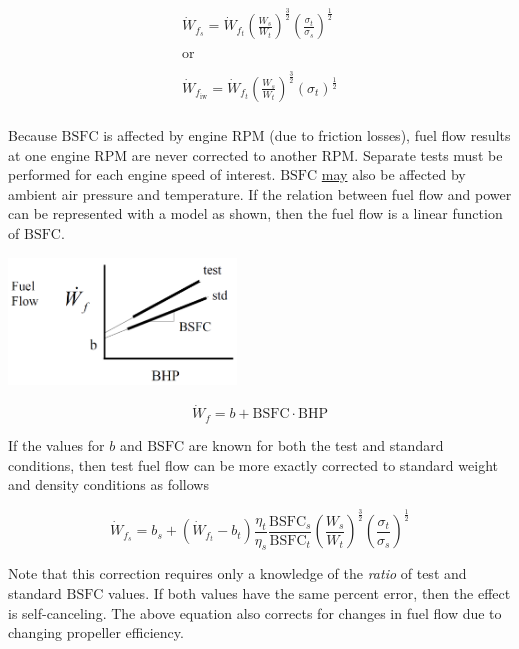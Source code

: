 \documentclass[
]{book}
\begin{document}
\begin{align}
\dot{W}_{f_s} = \dot{W}_{f_t} \left( \frac{W_s}{W_t} \right)^{\frac{3}{2}} \left( \frac{\sigma_t}{\sigma_s} \right)^{\frac{1}{2}} \\
\\
\text{or} \\
\\
\dot{W}_{f_{\text{iw}}} = \dot{W}_{f_t} \left( \frac{W_s}{W_t} \right)^{\frac{3}{2}} \left( \sigma_t \right)^{\frac{1}{2}} \\
\label{eq:fuel-flow-std}
\end{align}

Because \(\mathrm{BSFC}\) is affected by engine \(\mathrm{RPM}\) (due to
friction losses), fuel flow results at one engine \(\mathrm{RPM}\) are never
corrected to another \(\mathrm{RPM}\). Separate tests must be performed for each
engine speed of interest. \(\mathrm{BSFC}\) \underline{may} also be affected
by ambient air pressure and temperature. If the relation between fuel flow and
power can be represented with a model as shown, then the fuel flow is a linear
function of \(\mathrm{BSFC}\).

\includegraphics[width=2.38542in,height=1.33542in]{media/12/fuel-flow-power-curve.png}

\[
\dot{W}_f = b + \mathrm{BSFC} \cdot \mathrm{BHP}
\]

If the values for \(b\) and \(\mathrm{BSFC}\) are known for both the test and
standard conditions, then test fuel flow can be more exactly corrected to
standard weight and density conditions as follows

\[
\dot{W}_{f_s} = b_s + \left( \dot{W}_{f_t} - b_t \right) \frac{\eta_t}{\eta_s} \frac{\mathrm{BSFC}_s}{\mathrm{BSFC}_t} \left( \frac{W_s}{W_t} \right)^{\frac{3}{2}} \left( \frac{\sigma_t}{\sigma_s} \right)^{\frac{1}{2}}
\label{eq:fuel-flow-std-bsfc}
\]

Note that this correction requires only a knowledge of the \emph{ratio} of test and
standard \(\mathrm{BSFC}\) values. If both values have the same percent error,
then the effect is self-canceling. The above equation also corrects for changes
in fuel flow due to changing propeller efficiency.
\end{document}
